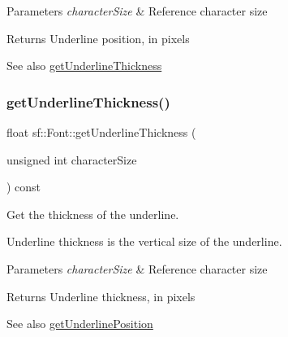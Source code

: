 \begin{DoxyParams}{Parameters}
{\em character\+Size} & Reference character size\\
\hline
\end{DoxyParams}
\begin{DoxyReturn}{Returns}
Underline position, in pixels
\end{DoxyReturn}
\begin{DoxySeeAlso}{See also}
\mbox{\hyperlink{classsf_1_1_font_ad6d0a5bc6c026fe85c239f1f822b54e6}{get\+Underline\+Thickness}} \begin{DoxyVerb}\end{DoxyVerb}
 
\end{DoxySeeAlso}
\mbox{\label{classsf_1_1_font_ad6d0a5bc6c026fe85c239f1f822b54e6}} 
\subsubsection{\texorpdfstring{getUnderlineThickness()}{getUnderlineThickness()}}
{\footnotesize\ttfamily float sf\+::\+Font\+::get\+Underline\+Thickness (\begin{DoxyParamCaption}\item[{unsigned int}]{character\+Size }\end{DoxyParamCaption}) const}



Get the thickness of the underline. 

Underline thickness is the vertical size of the underline.


\begin{DoxyParams}{Parameters}
{\em character\+Size} & Reference character size\\
\hline
\end{DoxyParams}
\begin{DoxyReturn}{Returns}
Underline thickness, in pixels
\end{DoxyReturn}
\begin{DoxySeeAlso}{See also}
\mbox{\hyperlink{classsf_1_1_font_a726a55f40c19ac108e348b103190caad}{get\+Underline\+Position}} \begin{DoxyVerb}\end{DoxyVerb}
 
\end{DoxySeeAlso}
\mbox{\label{classsf_1_1_font_ab020052ef4e01f6c749a85571c0f3fd1}} 
